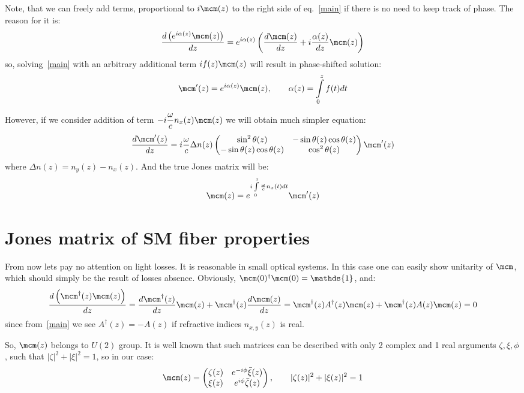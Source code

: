 \documentclass[12pt, notitlepage]{report}
\begin{document}
	Note, that we can freely add terms, proportional to $i\mcm(z)$ to the right side of eq.~\eqref{main} if there is no need to keep track of phase. The reason for it is:
	\begin{equation*}
		\dfrac{d\left(e^{i\alpha(z)}\mcm(z)\right)}{dz} = e^{i\alpha(z)}\left(\dfrac{d\mcm(z)}{dz} + i\dfrac{\alpha(z)}{dz}\mcm(z)\right)
	\end{equation*}
	so, solving~\eqref{main} with an arbitrary additional term $if(z)\mcm(z)$ will result in phase-shifted solution:
	\begin{equation*}
		\mcm'(z) = e^{i\alpha(z)}\mcm(z), \qquad \alpha(z) = \int\limits_0^zf(t)dt
	\end{equation*}

	However, if we consider addition of term $-i \dfrac{\omega}{c} n_x(z) \mcm(z)$ we will obtain much simpler equation:
	\begin{equation}
		\label{main2}
		\dfrac{d\mcm'(z)}{dz} = i\dfrac{\omega}{c}\Delta n(z)\begin{pmatrix}
			\sin^2\theta(z) & -\sin\theta(z)\cos\theta(z) \\
			-\sin\theta(z)\cos\theta(z) & \cos^2\theta(z)
		\end{pmatrix}\mcm'(z)
	\end{equation}
	where $\Delta n(z) = n_y(z) - n_x(z)$. And the true Jones matrix will be:
	\begin{equation}
		\label{true}
		\mcm(z) = e^{i\int\limits_0^z \frac{\omega}{c} n_x(t) dt}\mcm'(z)
	\end{equation}

\section{Jones matrix of SM fiber properties}
From now lets pay no attention on light losses. It is reasonable in small optical systems. In this case one can easily show unitarity of $\mcm$, which should simply be the result of losses absence. Obviously, $\mcm(0)^\dagger\mcm(0) = \mathds{1}$, and:
\begin{equation*}
	\dfrac{d\left(\mcm^\dagger(z)\mcm(z)\right)}{dz} = \dfrac{d\mcm^\dagger(z)}{dz}\mcm(z) + \mcm^\dagger(z)\dfrac{d\mcm(z)}{dz} = \mcm^\dagger(z) A^\dagger(z) \mcm(z) + \mcm^\dagger(z)A(z)\mcm(z) = 0
\end{equation*}
since from~\eqref{main} we see $A^\dagger(z)=-A(z)$ if refractive indices $n_{x,y}(z)$ is real. 

So, $\mcm(z)$ belongs to $U(2)$ group. It is well known that such matrices can be described with only 2 complex and 1 real arguments $\zeta, \xi, \phi$, such that $|\zeta|^2+|\xi|^2=1$, so in our case:
\begin{equation*}
	\mcm(z) = \begin{pmatrix}
		\zeta(z) & e^{-i\phi}\bar{\xi}(z) \\
		\xi(z) &  e^{i\phi}\bar{\zeta}(z)
	\end{pmatrix}, \qquad |\zeta(z)|^2+|\xi(z)|^2=1
\end{equation*}
\end{document}
